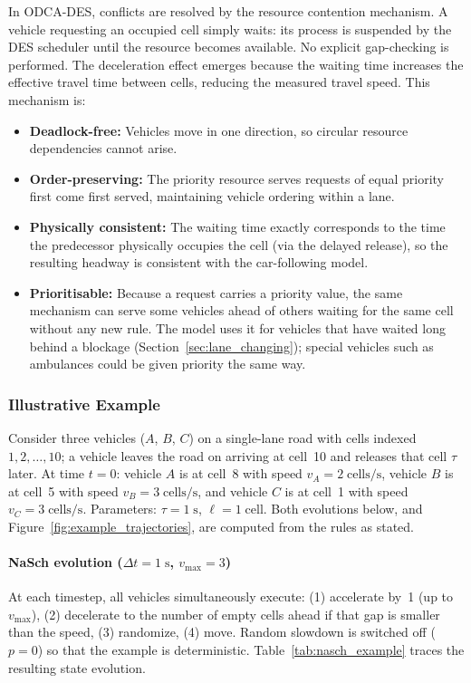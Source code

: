 \documentclass[review,number]{elsarticle}
\begin{document}
In ODCA-DES, conflicts are resolved by the resource contention mechanism. A vehicle requesting an occupied cell simply waits: its process is suspended by the DES scheduler until the resource becomes available. No explicit gap-checking is performed. The deceleration effect emerges because the waiting time increases the effective travel time between cells, reducing the measured travel speed. This mechanism is:
\begin{itemize}
    \item \textbf{Deadlock-free:} Vehicles move in one direction, so circular resource dependencies cannot arise.
    \item \textbf{Order-preserving:} The priority resource serves requests of equal priority first come first served, maintaining vehicle ordering within a lane.
    \item \textbf{Physically consistent:} The waiting time exactly corresponds to the time the predecessor physically occupies the cell (via the delayed release), so the resulting headway is consistent with the car-following model.
    \item \textbf{Prioritisable:} Because a request carries a priority value, the same mechanism can serve some vehicles ahead of others waiting for the same cell without any new rule. The model uses it for vehicles that have waited long behind a blockage (Section~\ref{sec:lane_changing}); special vehicles such as ambulances could be given priority the same way.
\end{itemize}

\subsubsection{Illustrative Example}

Consider three vehicles ($A$, $B$, $C$) on a single-lane road with cells indexed $1, 2, \ldots, 10$; a vehicle leaves the road on arriving at cell~10 and releases that cell $\tau$ later. At time $t=0$: vehicle $A$ is at cell~8 with speed $v_A = 2\;\text{cells/s}$, vehicle $B$ is at cell~5 with speed $v_B = 3\;\text{cells/s}$, and vehicle $C$ is at cell~1 with speed $v_C = 3\;\text{cells/s}$. Parameters: $\tau = 1\;\text{s}$, $\ell = 1\;\text{cell}$. Both evolutions below, and Figure~\ref{fig:example_trajectories}, are computed from the rules as stated.

\paragraph{NaSch evolution ($\Delta t = 1\;\text{s}$, $v_{\max} = 3$)}
At each timestep, all vehicles simultaneously execute: (1) accelerate by~1 (up to $v_{\max}$), (2) decelerate to the number of empty cells ahead if that gap is smaller than the speed, (3) randomize, (4) move. Random slowdown is switched off ($p = 0$) so that the example is deterministic. Table~\ref{tab:nasch_example} traces the resulting state evolution.
\end{document}
